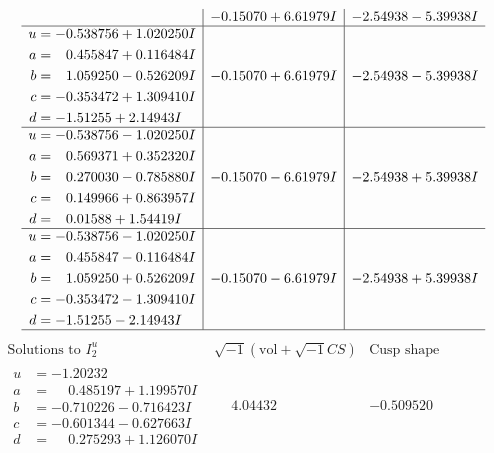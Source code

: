 \documentclass[1p]{elsarticle_modified}
\theoremstyle{definition}
\newcommand{\I}{\sqrt{-1}}
\begin{document}
$$\begin{array}{c|c|c}
 & -0.15070 + 6.61979 I & -2.54938 - 5.39938 I \\ \hline\begin{aligned}
u &= -0.538756 + 1.020250 I \\
a &= \phantom{-}0.455847 + 0.116484 I \\
b &= \phantom{-}1.059250 - 0.526209 I \\
c &= -0.353472 + 1.309410 I \\
d &= -1.51255 + 2.14943 I\end{aligned}
 & -0.15070 + 6.61979 I & -2.54938 - 5.39938 I \\ \hline\begin{aligned}
u &= -0.538756 - 1.020250 I \\
a &= \phantom{-}0.569371 + 0.352320 I \\
b &= \phantom{-}0.270030 - 0.785880 I \\
c &= \phantom{-}0.149966 + 0.863957 I \\
d &= \phantom{-}0.01588 + 1.54419 I\end{aligned}
 & -0.15070 - 6.61979 I & -2.54938 + 5.39938 I \\ \hline\begin{aligned}
u &= -0.538756 - 1.020250 I \\
a &= \phantom{-}0.455847 - 0.116484 I \\
b &= \phantom{-}1.059250 + 0.526209 I \\
c &= -0.353472 - 1.309410 I \\
d &= -1.51255 - 2.14943 I\end{aligned}
 & -0.15070 - 6.61979 I & -2.54938 + 5.39938 I\\
 \hline 
 \end{array}$$\newpage$$\begin{array}{c|c|c}  
\text{Solutions to }I^u_{2}& \I (\text{vol} + \sqrt{-1}CS) & \text{Cusp shape}\\
 \hline 
\begin{aligned}
u &= -1.20232\phantom{ +0.000000I} \\
a &= \phantom{-}0.485197 + 1.199570 I \\
b &= -0.710226 - 0.716423 I \\
c &= -0.601344 - 0.627663 I \\
d &= \phantom{-}0.275293 + 1.126070 I\end{aligned}
 & \phantom{-}4.04432\phantom{ +0.000000I} & -0.509520\phantom{ +0.000000I} \\ \hline\begin{aligned}

\end{aligned}
\end{array}$$
\end{document}
